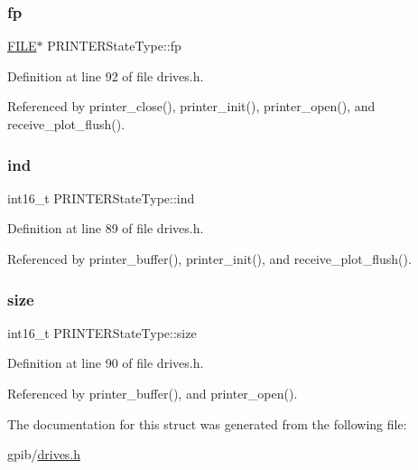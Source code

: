 \subsubsection{\texorpdfstring{fp}{fp}}
{\footnotesize\ttfamily \hyperlink{posix_8h_aed4dabeb9f7c518ded42f930a04abce8}{F\+I\+LE}$\ast$ P\+R\+I\+N\+T\+E\+R\+State\+Type\+::fp}



Definition at line 92 of file drives.\+h.



Referenced by printer\+\_\+close(), printer\+\_\+init(), printer\+\_\+open(), and receive\+\_\+plot\+\_\+flush().

\mbox{\label{structPRINTERStateType_a7d8873d0011f31d7dd00c2b7e0d362bd}} 
\subsubsection{\texorpdfstring{ind}{ind}}
{\footnotesize\ttfamily int16\+\_\+t P\+R\+I\+N\+T\+E\+R\+State\+Type\+::ind}



Definition at line 89 of file drives.\+h.



Referenced by printer\+\_\+buffer(), printer\+\_\+init(), and receive\+\_\+plot\+\_\+flush().

\mbox{\label{structPRINTERStateType_ac6d8323e47879ed58e7fa2cc7cfd7c30}} 
\subsubsection{\texorpdfstring{size}{size}}
{\footnotesize\ttfamily int16\+\_\+t P\+R\+I\+N\+T\+E\+R\+State\+Type\+::size}



Definition at line 90 of file drives.\+h.



Referenced by printer\+\_\+buffer(), and printer\+\_\+open().



The documentation for this struct was generated from the following file\+:\begin{DoxyCompactItemize}
\item 
gpib/\hyperlink{drives_8h}{drives.\+h}\end{DoxyCompactItemize}
